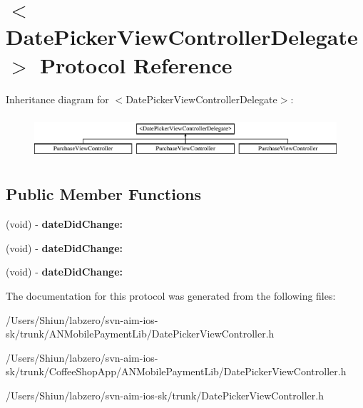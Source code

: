 \hypertarget{protocol_date_picker_view_controller_delegate-p}{
\section{$<$DatePickerViewControllerDelegate$>$ Protocol Reference}
\label{protocol_date_picker_view_controller_delegate-p}
}
Inheritance diagram for $<$DatePickerViewControllerDelegate$>$:\begin{figure}[H]
\begin{center}
\leavevmode
\includegraphics[height=1.623188cm]{protocol_date_picker_view_controller_delegate-p}
\end{center}
\end{figure}
\subsection*{Public Member Functions}
\begin{DoxyCompactItemize}
\item 
\hypertarget{protocol_date_picker_view_controller_delegate-p_a66911a1c911ab256dd17cfdfe6be030f}{
(void) -\/ {\bfseries dateDidChange:}}
\label{protocol_date_picker_view_controller_delegate-p_a66911a1c911ab256dd17cfdfe6be030f}

\item 
\hypertarget{protocol_date_picker_view_controller_delegate-p_a66911a1c911ab256dd17cfdfe6be030f}{
(void) -\/ {\bfseries dateDidChange:}}
\label{protocol_date_picker_view_controller_delegate-p_a66911a1c911ab256dd17cfdfe6be030f}

\item 
\hypertarget{protocol_date_picker_view_controller_delegate-p_a66911a1c911ab256dd17cfdfe6be030f}{
(void) -\/ {\bfseries dateDidChange:}}
\label{protocol_date_picker_view_controller_delegate-p_a66911a1c911ab256dd17cfdfe6be030f}

\end{DoxyCompactItemize}


The documentation for this protocol was generated from the following files:\begin{DoxyCompactItemize}
\item 
/Users/Shiun/labzero/svn-\/aim-\/ios-\/sk/trunk/ANMobilePaymentLib/DatePickerViewController.h\item 
/Users/Shiun/labzero/svn-\/aim-\/ios-\/sk/trunk/CoffeeShopApp/ANMobilePaymentLib/DatePickerViewController.h\item 
/Users/Shiun/labzero/svn-\/aim-\/ios-\/sk/trunk/DatePickerViewController.h\end{DoxyCompactItemize}
